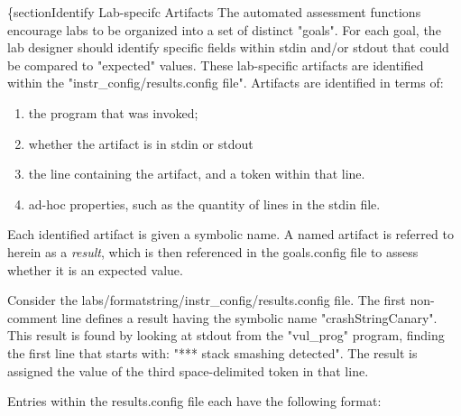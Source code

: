 \documentclass{article}
\begin{document}
\{section{Identify Lab-specifc Artifacts}
The automated assessment functions encourage labs to be organized into a set of distinct "goals".
For each goal, the lab designer should identify specific fields within stdin and/or stdout that
could be compared to "expected" values.  These lab-specific artifacts are identified within the
"instr\_config/results.config file".  Artifacts are identified in terms of:
\begin{enumerate}
\item the program that was invoked;
\item whether the artifact is in stdin or stdout
\item the line containing the artifact, and a token within that line.
\item ad-hoc properties, such as the quantity of lines in the stdin file.
\end{enumerate}

Each identified artifact is given a symbolic name. A named artifact is referred to herein as a \textit{result}, which 
is then referenced in the goals.config file to assess whether it is an expected value.

Consider the labs/formatstring/instr\_config/results.config file.  The first non-comment line
defines a result having the symbolic name "crashStringCanary".  This result is
found by looking at stdout from the "vul\_prog" program, finding the first line that starts with:
"*** stack smashing detected".  The result is assigned the value of the third space-delimited 
token in that line.

Entries within the results.config file each have the following format:
\end{document}
